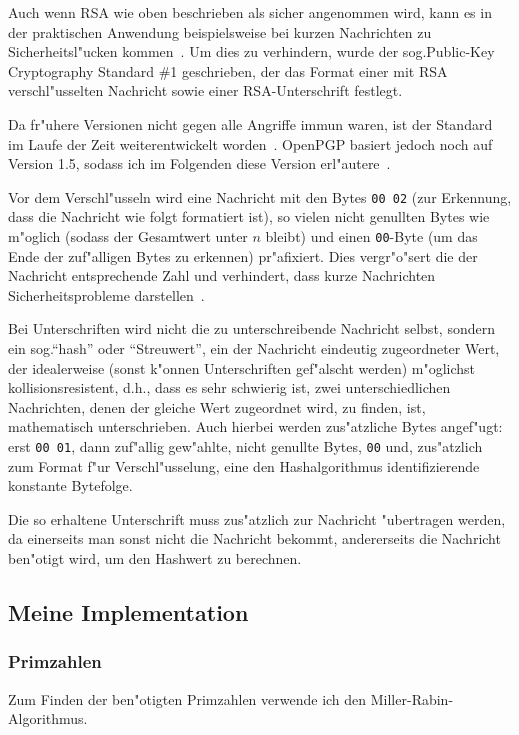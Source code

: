 \documentclass[12pt]{article}
\begin{document}
Auch wenn RSA wie oben beschrieben als sicher angenommen wird, kann es in der praktischen
Anwendung beispielsweise bei kurzen Nachrichten zu Sicherheitsl"ucken kommen~\cite{sinews}.
Um dies zu verhindern, wurde der sog.\@ Public-Key Cryptography Standard \#1 geschrieben,
der das Format einer mit RSA verschl"usselten Nachricht sowie einer RSA-Unterschrift festlegt.

Da fr"uhere Versionen nicht gegen alle Angriffe immun waren, ist der Standard
im Laufe der Zeit weiterentwickelt worden~\cite{sinews}.
OpenPGP basiert jedoch noch auf Version 1.5, sodass ich im Folgenden diese Version erl"autere~\cite{rfc4480}.

Vor dem Verschl"usseln wird eine Nachricht mit den Bytes \verb|00 02|
(zur Erkennung, dass die Nachricht wie folgt formatiert ist),
so vielen nicht genullten Bytes wie m"oglich (sodass der Gesamtwert unter $n$ bleibt)
und einen \verb|00|-Byte (um das Ende der zuf"alligen Bytes zu erkennen) pr"afixiert.
Dies vergr"o"sert die der Nachricht entsprechende Zahl und verhindert,
dass kurze Nachrichten Sicherheitsprobleme darstellen~\cite{rfc4480,sinews}.

Bei Unterschriften wird nicht die zu unterschreibende Nachricht selbst,
sondern ein sog.\@ "`hash"' oder "`Streuwert"', ein der Nachricht eindeutig zugeordneter Wert,
der idealerweise (sonst k"onnen Unterschriften gef"alscht werden) m"oglichst
kol\-li\-si\-ons\-re\-sis\-tent, d.h.\@, dass es sehr schwierig ist,
zwei unterschiedlichen Nachrichten, denen der gleiche Wert zugeordnet wird, zu finden,
ist, mathematisch unterschrieben.
Auch hierbei werden zus"atzliche Bytes angef"ugt: erst \verb|00 01|, dann zuf"allig gew"ahlte, nicht genullte Bytes,
\verb|00| und, zus"atzlich zum Format f"ur Verschl"usselung, eine den Hashalgorithmus identifizierende konstante Bytefolge.

Die so erhaltene Unterschrift muss zus"atzlich zur Nachricht "ubertragen werden,
da einerseits man sonst nicht die Nachricht bekommt, andererseits die Nachricht
ben"otigt wird, um den Hashwert zu berechnen.

\subsection{Meine Implementation}
\subsubsection{Primzahlen}
Zum Finden der ben"otigten Primzahlen verwende ich den Miller-Rabin-Algorithmus.
\end{document}
